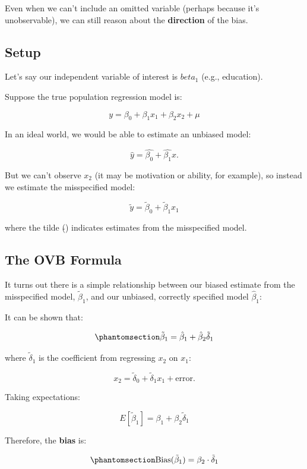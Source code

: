 \documentclass[
  letterpaper,
  DIV=11,
  numbers=noendperiod]{scrreprt}
\begin{document}
Even when we can't include an omitted variable (perhaps because it's
unobservable), we can still reason about the \textbf{direction} of the
bias.

\subsection{Setup}\label{setup}

Let's say our independent variable of interest is \(beta_1\) (e.g.,
education).

Suppose the true population regression model is:

\[
y = \beta_0 + \beta_1 x_1 + \beta_2 x_2 + \mu
\]

In an ideal world, we would be able to estimate an unbiased model:

\[
\hat{y} = \hat{\beta_0} + \hat{\beta_1} x. 
\]

But we can't observe \(x_2\) (it may be motivation or ability, for
example), so instead we estimate the misspecified model:

\[
\tilde{y} = \tilde{\beta}_0 + \tilde{\beta}_1 x_1
\]

where the tilde (\(\tilde{}\)) indicates estimates from the misspecified
model.

\subsection{The OVB Formula}\label{the-ovb-formula}

It turns out there is a simple relationship between our biased estimate
from the misspecified model, \(\tilde{\beta}_1\), and our unbiased,
correctly specified model \(\hat{\beta}_1\):

It can be shown that:

\begin{equation}\protect\phantomsection\label{eq-ovb-formula}{
\tilde{\beta}_1 = \hat{\beta}_1 + \hat{\beta}_2 \tilde{\delta}_1
}\end{equation}

where \(\tilde{\delta}_1\) is the coefficient from regressing \(x_2\) on
\(x_1\):

\[
x_2 = \tilde{\delta}_0 + \tilde{\delta}_1 x_1 + \text{error}.
\]

Taking expectations:

\[
E[\tilde{\beta}_1] = \beta_1 + \beta_2 \tilde{\delta}_1
\]

Therefore, the \textbf{bias} is:

\begin{equation}\protect\phantomsection\label{eq-ovb-bias}{
\text{Bias}(\tilde{\beta}_1) = \beta_2 \cdot \tilde{\delta}_1
}\end{equation}
\end{document}
